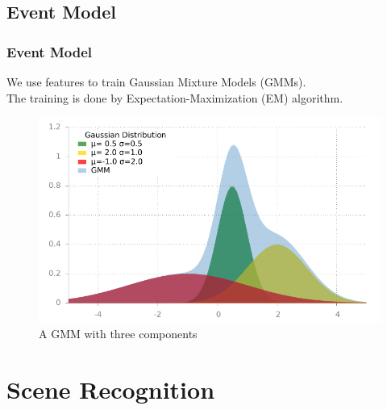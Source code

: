 \documentclass[xcolor=table,slidestop,compress,mathserif]{beamer}
\begin{document}
\subsection{Event Model}
\begin{frame}
	\frametitle{Event Model}	
	We use features to train Gaussian Mixture Models (GMMs). \\ 
	The training is done by Expectation-Maximization (EM) algorithm. \\  
	\begin{figure}
		\includegraphics[scale=0.6]{figure/gmm.pdf}
		\caption{A GMM with three components}
	\end{figure}
\end{frame}
\section{Scene Recognition}
\end{document}
